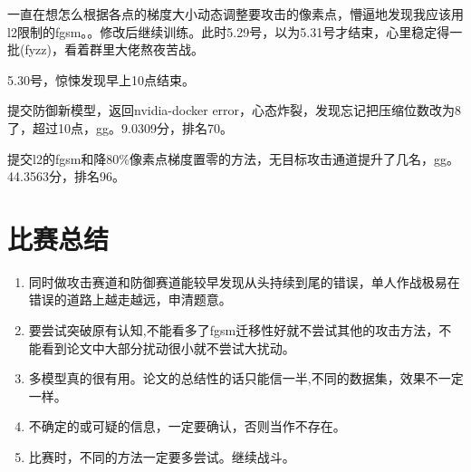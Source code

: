 \documentclass[]{article}
\begin{document}
一直在想怎么根据各点的梯度大小动态调整要攻击的像素点，懵逼地发现我应该用l2限制的fgsm。。修改后继续训练。此时5.29号，以为5.31号才结束，心里稳定得一批(fyzz)，看着群里大佬熬夜苦战。

5.30号，惊悚发现早上10点结束。

提交防御新模型，返回nvidia-docker error，心态炸裂，发现忘记把压缩位数改为8了，超过10点，gg。9.0309分，排名70。

提交l2的fgsm和降80\%像素点梯度置零的方法，无目标攻击通道提升了几名，gg。44.3563分，排名96。
\section{比赛总结}

\begin{enumerate}
	\item 同时做攻击赛道和防御赛道能较早发现从头持续到尾的错误，单人作战极易在错误的道路上越走越远，申清题意。
	\item 要尝试突破原有认知,不能看多了fgsm迁移性好就不尝试其他的攻击方法，不能看到论文中大部分扰动很小就不尝试大扰动。
	\item 多模型真的很有用。论文的总结性的话只能信一半,不同的数据集，效果不一定一样。
	\item 不确定的或可疑的信息，一定要确认，否则当作不存在。
	\item 比赛时，不同的方法一定要多尝试。继续战斗。
\end{enumerate}
\end{document}
